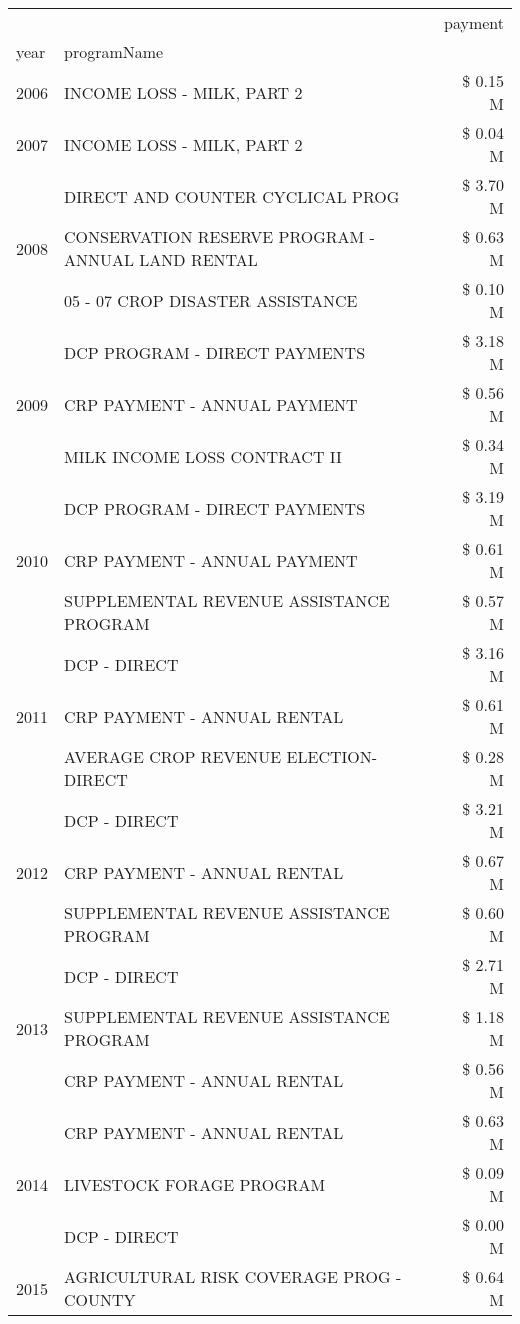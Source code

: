 \begin{tabular}{llr}
\toprule
 &  & payment \\
year & programName &  \\
\midrule
2006 & INCOME LOSS - MILK, PART 2 & \$ 0.15 M \\
\cline{1-3}
2007 & INCOME LOSS - MILK, PART 2 & \$ 0.04 M \\
\cline{1-3}
\multirow[t]{3}{*}{2008} & DIRECT AND COUNTER CYCLICAL PROG & \$ 3.70 M \\
 & CONSERVATION RESERVE PROGRAM - ANNUAL LAND RENTAL & \$ 0.63 M \\
 & 05 - 07 CROP DISASTER ASSISTANCE & \$ 0.10 M \\
\cline{1-3}
\multirow[t]{3}{*}{2009} & DCP PROGRAM - DIRECT PAYMENTS & \$ 3.18 M \\
 & CRP PAYMENT - ANNUAL PAYMENT & \$ 0.56 M \\
 & MILK INCOME LOSS CONTRACT II & \$ 0.34 M \\
\cline{1-3}
\multirow[t]{3}{*}{2010} & DCP PROGRAM - DIRECT PAYMENTS & \$ 3.19 M \\
 & CRP PAYMENT - ANNUAL PAYMENT & \$ 0.61 M \\
 & SUPPLEMENTAL REVENUE ASSISTANCE PROGRAM & \$ 0.57 M \\
\cline{1-3}
\multirow[t]{3}{*}{2011} & DCP - DIRECT & \$ 3.16 M \\
 & CRP PAYMENT - ANNUAL RENTAL & \$ 0.61 M \\
 & AVERAGE CROP REVENUE ELECTION-DIRECT & \$ 0.28 M \\
\cline{1-3}
\multirow[t]{3}{*}{2012} & DCP - DIRECT & \$ 3.21 M \\
 & CRP PAYMENT - ANNUAL RENTAL & \$ 0.67 M \\
 & SUPPLEMENTAL REVENUE ASSISTANCE PROGRAM & \$ 0.60 M \\
\cline{1-3}
\multirow[t]{3}{*}{2013} & DCP - DIRECT & \$ 2.71 M \\
 & SUPPLEMENTAL REVENUE ASSISTANCE PROGRAM & \$ 1.18 M \\
 & CRP PAYMENT - ANNUAL RENTAL & \$ 0.56 M \\
\cline{1-3}
\multirow[t]{3}{*}{2014} & CRP PAYMENT - ANNUAL RENTAL & \$ 0.63 M \\
 & LIVESTOCK FORAGE PROGRAM & \$ 0.09 M \\
 & DCP - DIRECT & \$ 0.00 M \\
\cline{1-3}
\multirow[t]{3}{*}{2015} & AGRICULTURAL RISK COVERAGE PROG - COUNTY & \$ 0.64 M \\

\end{tabular}
